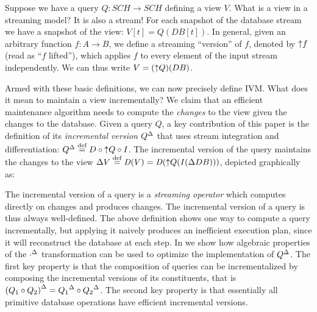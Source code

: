 Suppose we have a query $Q : SCH \to SCH$ defining a view $V$.  What is
a view in a streaming model?  It is also a stream!  For each snapshot
of the database stream we have a snapshot of the view: $V[t] = Q(DB[t])$.
In general, given an arbitrary function $f: A \to B$, we define
a streaming ``version'' of $f$, denoted by ${\uparrow}f$
(read as ``$f$ lifted''), which applies
$f$ to every element of the input stream independently.
We can thus write $V = ({\uparrow}Q)(DB)$.

Armed with these basic definitions, we can now precisely define IVM.
What does it mean to maintain a view incrementally?  We claim that an
efficient maintenance algorithm needs to compute the \emph{changes} to
the view given the changes to the database. Given a query $Q$, a key
contribution of this paper is the definition of its \emph{incremental
  version} ${Q}^{\Delta}$ that uses stream integration and differentiation:
${Q}^{\Delta} \stackrel{\textrm{\scriptsize def}}{=} D \circ {\uparrow}Q \circ I$. The incremental version of
the query maintains the changes to the view $\Delta V \stackrel{\textrm{\scriptsize def}}{=} \mathit{D}(V) =
\mathit{D}({\uparrow}Q(\mathit{I}(\Delta DB)))$, depicted graphically as:

\begin{center}
\end{center}

The incremental version of a query is a \emph{streaming operator}
which computes directly on changes and produces changes.  The
incremental version of a query is thus always well-defined.  The above
definition shows one way to compute a query incrementally, but
applying it naively produces an inefficient execution plan, since it
will reconstruct the database at each step.  In
 we show how algebraic properties of the
${\cdot}^{\Delta}$ transformation can be used to optimize the
implementation of ${Q}^{\Delta}$. The first key property is that the
composition of queries can be incrementalized by composing the
incremental versions of its constituents, that is ${(Q_1 \circ
  Q_2)}^{\Delta} = {Q_1}^{\Delta} \circ {Q_2}^{\Delta}$.  The second key property is that
essentially all primitive database operations have efficient
incremental versions.

